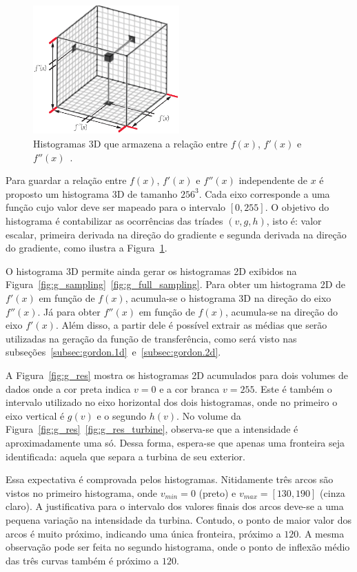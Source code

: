 \begin{figure}[b]
	\centering
	\includegraphics[width=0.5\textwidth]{images/g_histo3d}
	\caption{Histogramas 3D que armazena a relação entre $ f(x) $, $ f'(x) $ e $ f''(x) $~\cite{gordonms}.}
	\label{fig:g_histo3d}
\end{figure}
	
	Para guardar a relação entre $ f(x) $, $ f'(x) $ e $ f''(x) $ independente de $x$ é proposto um histograma 3D de tamanho $ 256^{3} $. Cada eixo corresponde a uma função cujo valor deve ser mapeado para o intervalo $ [0,255] $. O objetivo do histograma é contabilizar as ocorrências das tríades $ (v,g,h) $, isto é: valor escalar, primeira derivada na direção do gradiente e segunda derivada na direção do gradiente, como ilustra a Figura~\ref{fig:g_histo3d}.
	
	O histograma 3D permite ainda gerar os histogramas 2D exibidos na Figura~\ref{fig:g_sampling}~\ref{fig:g_full_sampling}. Para obter um histograma 2D de $ f'(x) $ em função de $ f(x) $, acumula-se o histograma 3D na direção do eixo $ f''(x) $. Já para obter $ f''(x) $ em função de $ f(x) $, acumula-se na direção do eixo $ f'(x) $. Além disso, a partir dele é possível extrair as médias que serão utilizadas na geração da função de transferência, como será visto nas subseções~\ref{subsec:gordon.1d}~e~\ref{subsec:gordon.2d}.
	
	A Figura~\ref{fig:g_res} mostra os histogramas 2D acumulados para dois volumes de dados onde a cor preta indica $ v = 0 $ e a cor branca $ v = 255 $. Este é também o intervalo utilizado no eixo horizontal dos dois histogramas, onde no primeiro o eixo vertical é $ g(v) $ e o segundo $ h(v) $. No volume  da Figura~\ref{fig:g_res}~\ref{fig:g_res_turbine}, observa-se que a intensidade é aproximadamente uma só. Dessa forma, espera-se que apenas uma fronteira seja identificada: aquela que separa a turbina de seu exterior.
	
	Essa expectativa é comprovada pelos histogramas. Nitidamente três arcos são vistos no primeiro histograma, onde $ v_{min} = 0 $ (preto) e $ v_{max} = [130,190] $ (cinza claro). A justificativa para o intervalo dos valores finais dos arcos deve-se a uma pequena variação na intensidade da turbina. Contudo, o ponto de maior valor dos arcos é muito próximo, indicando uma única fronteira, próximo a $ 120 $. A mesma observação pode ser feita no segundo histograma, onde o ponto de inflexão médio das três curvas também é próximo a $ 120 $.
	
